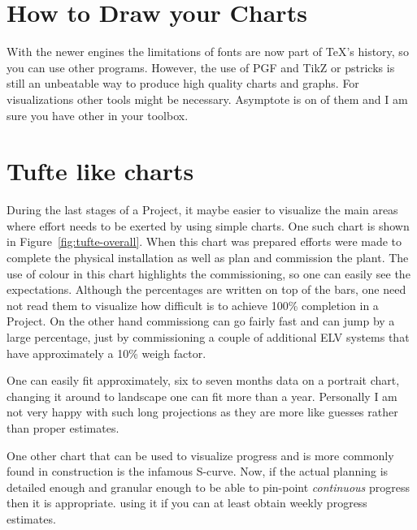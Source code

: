 \section{How to Draw your Charts}

With the newer engines the limitations of fonts are now part of TeX’s history, so you can use other programs. However, the use of PGF and TikZ or pstricks is still an unbeatable way to produce high quality charts and graphs.
For visualizations other tools might be necessary. Asymptote is on of them and I am sure you have other in your toolbox.

\section{Tufte like charts}

During the last stages of a Project, it maybe easier to visualize the
main areas where effort needs to be exerted by using simple charts. One
such chart is shown in Figure~\ref{fig:tufte-overall}. When this chart
was prepared efforts were made to complete the physical installation
as well as plan and commission the plant. The use of colour in this
chart highlights the commissioning, so one can easily see the expectations. Although the percentages are written on top of the bars,
one need not read them to visualize how difficult is to achieve
100\% completion in a Project. On the other hand commissiong can go
fairly fast and can jump by a large percentage, just by
commissioning a couple of additional ELV systems that have approximately
a 10\% weigh factor.

One can easily fit approximately, six to seven months data on
a portrait chart, changing it around to landscape one can fit
more than a year. Personally I am not very happy with such long
projections as they are more like guesses rather than proper estimates.

One other chart that can be used to visualize progress and is more
commonly found in construction is the infamous S-curve. Now, if
the actual planning is detailed enough and granular enough to be
able to pin-point \textit{continuous} progress then it is
appropriate. using it if you can at least obtain weekly progress
estimates.


